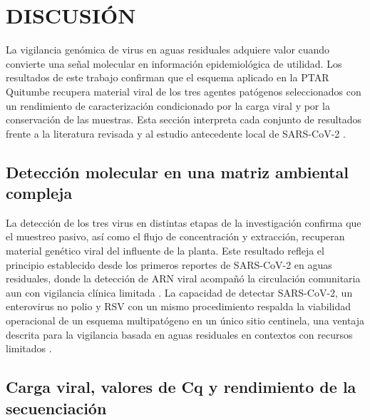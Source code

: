 \section{DISCUSIÓN}

La vigilancia genómica de virus en aguas residuales adquiere valor cuando convierte una señal molecular en información epidemiológica de utilidad. Los resultados de este trabajo confirman que el esquema aplicado en la PTAR Quitumbe recupera material viral de los tres agentes patógenos seleccionados con un rendimiento de caracterización condicionado por la carga viral y por la conservación de las muestras. Esta sección interpreta cada conjunto de resultados frente a la literatura revisada y al estudio antecedente local de SARS-CoV-2 \cite{MejiaCalle_2024}.

\subsection{Detección molecular en una matriz ambiental compleja}

La detección de los tres virus en distintas etapas de la investigación confirma que el muestreo pasivo, así como el flujo de concentración y extracción, recuperan material genético viral del influente de la planta. Este resultado refleja el principio establecido desde los primeros reportes de SARS-CoV-2 en aguas residuales, donde la detección de ARN viral acompañó la circulación comunitaria aun con vigilancia clínica limitada \cite{Ahmed_2020,Medema_2020}. La capacidad de detectar SARS-CoV-2, un enterovirus no polio y RSV con un mismo procedimiento respalda la viabilidad operacional de un esquema multipatógeno en un único sitio centinela, una ventaja descrita para la vigilancia basada en aguas residuales en contextos con recursos limitados \cite{Parkins_2023,Bubba_2023}.

\subsection{Carga viral, valores de Cq y rendimiento de la secuenciación}


